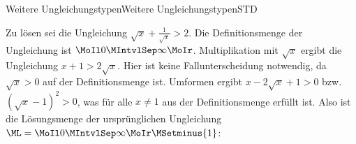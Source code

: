\begin{MXContent}{Weitere Ungleichungstypen}{Weitere Ungleichungstypen}{STD}
\begin{MExample}
Zu lösen sei die Ungleichung $\sqrt{x}+\frac1{\sqrt{x}}>2$. Die Definitionsmenge der Ungleichung ist $\MoIl 0\MIntvlSep \infty\MoIr$.
Multiplikation mit $\sqrt{x}$ ergibt die Ungleichung $x+1>2\sqrt x$. Hier ist keine Fallunterscheidung notwendig, da $\sqrt{x}>0$ auf der Definitionsmenge ist.
Umformen ergibt $x-2\sqrt{x}+1>0$ bzw. $(\sqrt{x}-1)^2>0$, was für alle $x\not=1$ aus der Definitionsmenge erfüllt ist.
Also ist die Lösungsmenge der ursprünglichen Ungleichung $\ML=\MoIl 0\MIntvlSep \infty\MoIr\MSetminus\lbrace 1\rbrace$:
\ \\ \ \\
\begin{center}
\end{center}

\end{MExample}

\end{MXContent}



